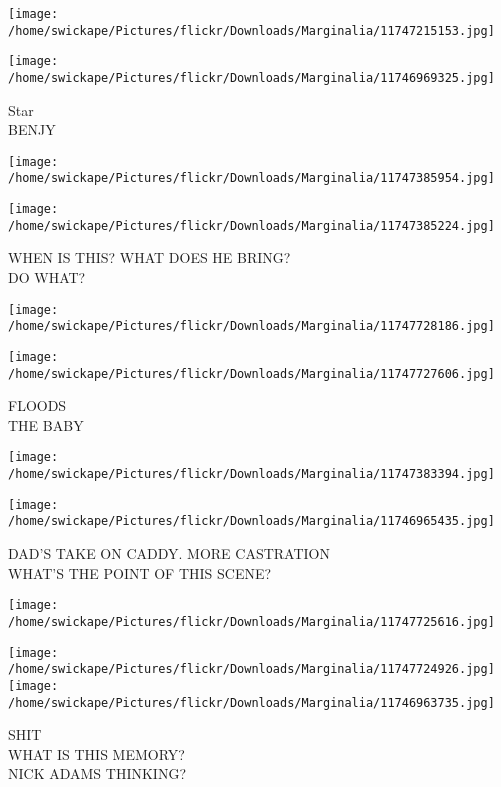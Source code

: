 \documentclass[10pt,letterpaper]{article}
\begin{document}
\texttt{[image: /home/swickape/Pictures/flickr/Downloads/Marginalia/11747215153.jpg]}

\vspace{0.25in}
\texttt{[image: /home/swickape/Pictures/flickr/Downloads/Marginalia/11746969325.jpg]}

Star\\
BENJY\\
\pagebreak

\texttt{[image: /home/swickape/Pictures/flickr/Downloads/Marginalia/11747385954.jpg]}

\vspace{0.25in}
\texttt{[image: /home/swickape/Pictures/flickr/Downloads/Marginalia/11747385224.jpg]}

WHEN IS THIS? WHAT DOES HE BRING?\\
DO WHAT?\\
\pagebreak

\texttt{[image: /home/swickape/Pictures/flickr/Downloads/Marginalia/11747728186.jpg]}

\vspace{0.25in}
\texttt{[image: /home/swickape/Pictures/flickr/Downloads/Marginalia/11747727606.jpg]}

FLOODS\\
THE BABY\\
\pagebreak

\texttt{[image: /home/swickape/Pictures/flickr/Downloads/Marginalia/11747383394.jpg]}

\vspace{0.25in}
\texttt{[image: /home/swickape/Pictures/flickr/Downloads/Marginalia/11746965435.jpg]}

DAD'S TAKE ON CADDY.  MORE CASTRATION\\
WHAT'S THE POINT OF THIS SCENE?\\
\pagebreak

\texttt{[image: /home/swickape/Pictures/flickr/Downloads/Marginalia/11747725616.jpg]}

\vspace{0.25in}
\texttt{[image: /home/swickape/Pictures/flickr/Downloads/Marginalia/11747724926.jpg]}
\texttt{[image: /home/swickape/Pictures/flickr/Downloads/Marginalia/11746963735.jpg]}

SHIT\\
WHAT IS THIS MEMORY?\\
NICK ADAMS THINKING?\\
\pagebreak
\end{document}
